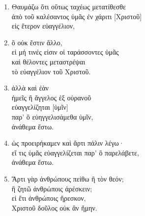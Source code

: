 \documentclass[12pt,a4paper,titlepage]{article}
\newlength{\indentunit}
\newlength{\curindent}
\newcommand{\indentlvl}[1]{\setlength{\curindent}{#1\indentunit}\hspace*{\curindent}}
\def \pscolor{red} %
\def \pslabelsep{0.3em} %
\def \psleftmargin{1.5em} %
\begin{document}
\begin{enumerate}[leftmargin=\psleftmargin, labelsep=\pslabelsep, label=\arabic*, align=right, font=\fontspec{Linux Libertine}\color{\pscolor}\small\textsuperscript, parsep=0em, itemsep=0em, topsep=0em]
        \subsection*{La situation: on détourne les Galates de l'unique Évangile}
  \item Θαυμάζω ὅτι οὕτως ταχέως μετατίθεσθε \\
        \indentlvl{1}ἀπὸ τοῦ καλέσαντος ὑμᾶς ἐν χάριτι [Χριστοῦ]\\
        \indentlvl{2}εἰς ἕτερον εὐαγγέλιον,
  \item \indentlvl{3}ὃ οὐκ ἔστιν ἄλλο, \\
        \indentlvl{4}εἰ μή τινές εἰσιν οἱ ταράσσοντες ὑμᾶς \\
        \indentlvl{4}καὶ θέλοντες μεταστρέψαι \\
        \indentlvl{5}τὸ εὐαγγέλιον τοῦ Χριστοῦ.
  \item ἀλλὰ καὶ ἐὰν \\
        \indentlvl{1}ἡμεῖς ἢ ἄγγελος ἐξ οὐρανοῦ\\
        εὐαγγελίζηται [ὑμῖν] \\
        \indentlvl{1}παρ’ ὃ εὐηγγελισάμεθα ὑμῖν, \\
        ἀνάθεμα ἔστω.
  \item ὡς προειρήκαμεν καὶ ἄρτι πάλιν λέγω·\\
        \indentlvl{1} εἴ τις ὑμᾶς εὐαγγελίζεται παρ’ ὃ παρελάβετε,\\
        ἀνάθεμα ἔστω.
  \item Ἄρτι γὰρ ἀνθρώπους πείθω ἢ τὸν θεόν;\\
        ἢ ζητῶ ἀνθρώποις ἀρέσκειν;\\
        εἰ ἔτι ἀνθρώποις ἤρεσκον,\\
        \indentlvl{1} Χριστοῦ δοῦλος οὐκ ἂν ἤμην.


\end{enumerate}
\end{document}
